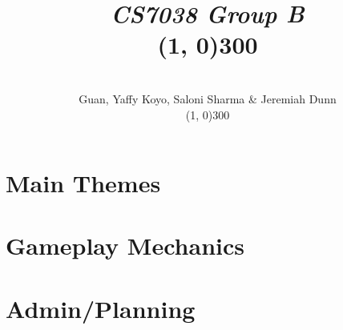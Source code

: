 \documentclass[12pt]{article}
\title{\textit{CS7038 Group B}\hspace{0.75cm}\\\line(1, 0){300}
}
\author
{\vspace{-1.2cm}\\ Guan, Yaffy Koyo, Saloni Sharma \& Jeremiah Dunn\\\line(1, 0){300}}
\date{}
\begin{document}
 

\maketitle 

\section{Main Themes}



\section{Gameplay Mechanics}







\section{Admin/Planning}









\end{document}

